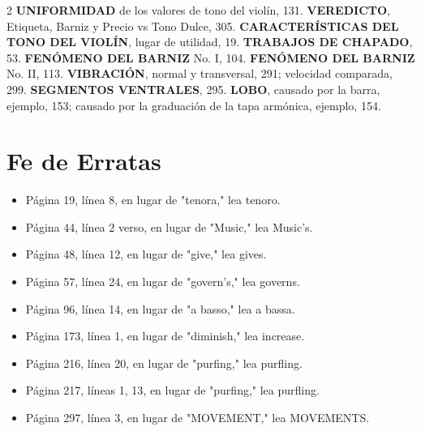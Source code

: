 \begin{multicols}{2}
\textbf{UNIFORMIDAD} de los valores de tono del violín, 131.
\textbf{VEREDICTO}, Etiqueta, Barniz y Precio vs Tono Dulce, 305.
\textbf{CARACTERÍSTICAS DEL TONO DEL VIOLÍN}, lugar de utilidad, 19.
\textbf{TRABAJOS DE CHAPADO}, 53.
\textbf{FENÓMENO DEL BARNIZ} No. I, 104.
\textbf{FENÓMENO DEL BARNIZ} No. II, 113.
\textbf{VIBRACIÓN}, normal y transversal, 291; velocidad comparada, 299.
\textbf{SEGMENTOS VENTRALES}, 295.
\textbf{LOBO}, causado por la barra, ejemplo, 153; causado por la graduación de la tapa armónica, ejemplo, 154.
\end{multicols}

\section*{Fe de Erratas}

\begin{itemize}
    \item Página 19, línea 8, en lugar de "tenora," lea tenoro.
    \item Página 44, línea 2 verso, en lugar de "Music," lea Music's.
    \item Página 48, línea 12, en lugar de "give," lea gives.
    \item Página 57, línea 24, en lugar de "govern's," lea governs.
    \item Página 96, línea 14, en lugar de "a basso," lea a bassa.
    \item Página 173, línea 1, en lugar de "diminish," lea increase.
    \item Página 216, línea 20, en lugar de "purfing," lea purfling.
    \item Página 217, líneas 1, 13, en lugar de "purfing," lea purfling.
    \item Página 297, línea 3, en lugar de "MOVEMENT," lea MOVEMENTS.
\end{itemize}